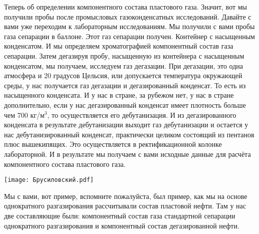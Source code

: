 \documentclass[main.tex]{subfiles}
\begin{document}
Теперь об определении компонентного состава пластового газа.
Значит, вот мы получили пробы после промысловых газоконденсатных исследований.
Давайте с вами уже переходим к лабораторным исследованиям.
Мы получили с вами пробы газа сепарации в баллоне.
Этот газ сепарации получен.
Контейнер с насыщенным конденсатом.
И мы определяем хроматографией компонентный состав газа сепарации.
Затем дегазируя пробу, насыщенную из контейнера с насыщенным конденсатом, мы получаем, исследуем газ дегазации.
При дегазации, это одна атмосфера и 20 градусов Цельсия, или допускается температура окружающей среды, у нас получается газ дегазации и дегазированный конденсат.
То есть из насыщенного конденсата.
И у нас в стране, за рубежом нет, у нас в стране дополнительно, если у нас дегазированный конденсат имеет плотность больше чем 700 кг/м$^3$, то осуществляется его дебутанизация.
И из дегазированного конденсата в результате дебутанизации выходит газ дебутанизации и остается у нас дебутанизированный конденсат, практически целиком состоящий из пентанов плюс вышекипящих.
Это осуществляется в ректификационной колонке лабораторной.
И в результате мы получаем с вами исходные данные для расчёта компонентного состава пластового газа.

\begin{center}
\texttt{[image: Брусиловский.pdf]}
\end{center}

Мы с вами, вот пример, вспомните пожалуйста, был пример, как мы на основе однократного разгазирования рассчитывали состав пластовой нефти.
Там у нас две составляющие были: компонентный состав газа стандартной сепарации однократного разгазирования и компонентный состав дегазированной нефти.
\end{document}
